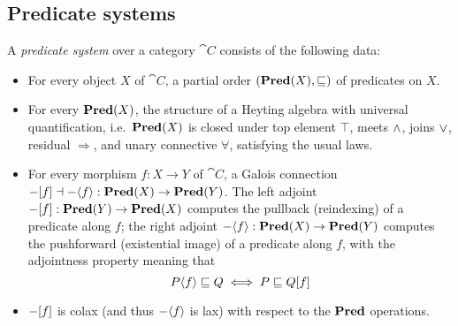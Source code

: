 \subsection{Predicate systems}
\label{sec:predicate-system}

A \emph{predicate system} over a category $\cat{C}$ consists of the following data:
\begin{itemize}
\item For every object $X$ of $\cat{C}$, a partial order $(\mathbf{Pred}(X), \sqsubseteq)$ of predicates on $X$.
\item For every $\mathbf{Pred}(X)$, the structure of a Heyting algebra  with universal
   quantification, i.e.~$\mathbf{Pred}(X)$ is closed under top element $\top$, meets $\wedge$, joins $\vee$, residual
   $\Rightarrow$, and unary connective $\forall$, satisfying the usual laws.
\item For every morphism $f: X \to Y$ of $\cat{C}$, a Galois connection $-[f] \dashv
-\langle f\rangle : \mathbf{Pred}(X) \to \mathbf{Pred}(Y)$. The left adjoint $-[f]: \mathbf{Pred}(Y) \to \mathbf{Pred}(X)$ computes
the pullback (reindexing) of a predicate along $f$; the right adjoint $-\langle f\rangle: \mathbf{Pred}(X) \to
\mathbf{Pred}(Y)$ computes the pushforward (existential image) of a predicate along $f$, with the adjointness property
meaning that
\[P\langle f\rangle \sqsubseteq Q \iff P \sqsubseteq Q[f] \]
\item $-[f]$ is colax (and thus $-\langle f\rangle$ is lax) with respect to the $\mathbf{Pred}$ operations.
\end{itemize}
